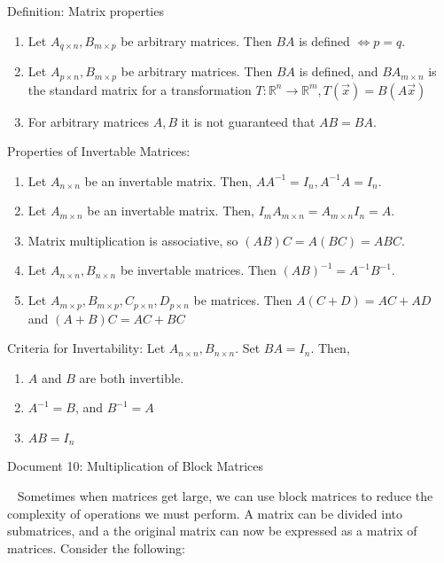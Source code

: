 \documentclass[12pt]{article}
\begin{document}
Definition: Matrix properties
\begin{enumerate}
\item Let $A_{q\times n},B_{m\times p}$ be arbitrary matrices. Then $BA$ is defined $\Leftrightarrow p=q$.
\item Let $A_{p\times n},B_{m\times p}$ be arbitrary matrices. Then $BA$ is defined, and $BA_{m\times n}$ is the standard matrix for a transformation $T:\mathbb{R}^n\rightarrow\mathbb{R}^m,T(\vec{x})=B(A\vec{x})$
\item For arbitrary matrices $A,B$ it is not guaranteed that $AB=BA$.\\
\end{enumerate}

Properties of Invertable Matrices:
\begin{enumerate}
\item Let $A_{n\times n}$ be an invertable matrix. Then, $AA^{-1}=I_n,A^{-1}A=I_n$.
\item Let $A_{m\times n}$ be an invertable matrix. Then, $I_mA_{m\times n}=A_{m\times n}I_n=A$.
\item Matrix multiplication is associative, so $(AB)C=A(BC)=ABC$.
\item Let $A_{n\times n},B_{n\times n}$ be invertable matrices. Then $(AB)^{-1}=A^{-1}B^{-1}$.
\item Let $A_{m\times p},B_{m\times p},C_{p\times n},D_{p\times n}$ be matrices. Then $A(C+D)=AC+AD$ and $(A+B)C=AC+BC$\\
\end{enumerate}

Criteria for Invertability: Let $A_{n\times n},B_{n\times n}$. Set $BA=I_n$. Then,
\begin{enumerate}
\item $A$ and $B$ are both invertible.
\item $A^{-1}=B$, and $B^{-1}=A$
\item $AB=I_n$
\end{enumerate}

\newpage
\begin{center}
Document 10: Multiplication of Block Matrices
\end{center}

\setlength{\leftskip}{0 in}
$\,\,\,$ Sometimes when matrices get large, we can use block matrices to reduce the complexity of operations we must perform. A matrix can be divided into submatrices, and a the original matrix can now be expressed as a matrix of matrices. Consider the following:
\end{document}
